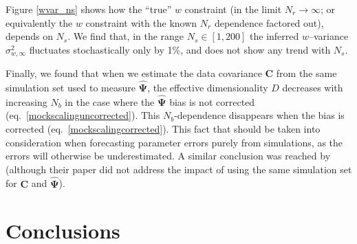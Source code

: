 \documentclass[reprint,aps,prd,superscriptaddress,showkeys,showpacs]{revtex4-1}
\newcommand{\bb}[1]{\mathbf{#1}}
\newcommand{\bbh}[1]{\mathbf{\hat{#1}}}
\begin{document}
Figure \ref{wvar_ns} shows how the ``true'' $w$ constraint (in the
limit $N_r\rightarrow \infty$; or equivalently the $w$ constraint with
the known $N_r$ dependence factored out), depends on $N_s$. We find
that, in the range $N_s\in[1,200]$ the inferred $w$--variance
$\sigma_{w,\infty}^2$ fluctuates stochastically only by 1\%, and does
not show any trend with $N_s$.

Finally, we found that when we estimate the data covariance $\bb{C}$
from the same simulation set used to measure $\bbh{\Psi}$, the
effective dimensionality $D$ decreases with increasing $N_b$ in the
case where the $\bbh{\Psi}$ bias is not corrected
(eq.~\ref{mockscalinguncorrected}).  This $N_b$-dependence disappears
when the bias is corrected (eq.~\ref{mockscalingcorrected}).  This
fact that should be taken into consideration when forecasting
parameter errors purely from simulations, as the errors will otherwise
be underestimated. A similar conclusion was reached by
\citep{Hartlap07} (although their paper did not address the impact of
using the same simulation set for $\bb{C}$ and $\bbh{\Psi}$).




\section{Conclusions}
\end{document}
